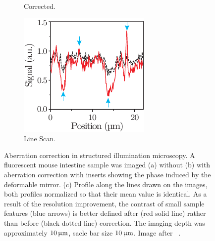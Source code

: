 \begin{figure}[tbh]
\begin{subfigure}[b]{0.25\textwidth}
                \caption{Corrected.}
                \label{fig:SI_corrected}
        \end{subfigure}
        \begin{subfigure}[b]{0.25\textwidth}
                \includegraphics[width=\textwidth]{images/structured_illumination_scan}
                \caption{Line Scan.}
                \label{fig:SI_scan}
        \end{subfigure}
								
        \caption{Aberration correction in structured illumination microscopy. 
A fluorescent mouse intestine sample was imaged (a) without (b) with 
aberration correction with inserts showing the phase induced by the 
deformable mirror. (c) Profile along the lines drawn on the images, both 
profiles normalized so that their mean value is identical. As a result of the 
resolution improvement, the contrast of small sample features (blue arrows) 
is better defined after (red solid line) rather than before (black dotted 
line) correction. The imaging depth was approximately $\unit[10]{\upmu m}$, 
sacle bar size $\unit[10]{\upmu m}$. Image after~\cite{wide_AOM_structured_illu}
.}
\label{fig:structured_light_correction}
\end{figure} 

